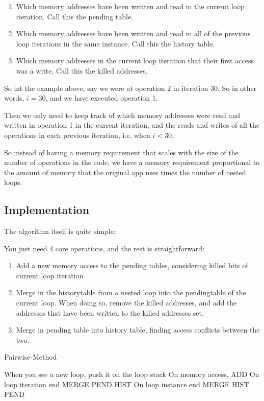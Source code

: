 \documentclass[12pt,twoside]{reedthesis}
\begin{document}
		\begin{enumerate}
			\item Which memory addresses have been written and read in the current loop iteration. Call this the pending table.
			\item Which memory addresses have been written and read in all of the previous loop iterations in the same instance. Call this the history table.
			\item Which memory addresses in the current loop iteration that their first access was a write. Call this the killed addresses.
		\end{enumerate}

		So int the example above, say we were at operation 2 in iteration 30. So in other words, $i=30$, and we have executed operation 1.

		Then we only need to keep track of which memory addresses were read and written in operation 1 in the current iteration, and the reads and writes of all the operations in each previous iteration, i.e. when $i < 30$.

		So instead of having a memory requirement that scales with the size of the number of operations in the code, we have a memory requirement proportional to the amount of memory that the original app uses times the number of nested loops.

		\subsection{Implementation}

		The algorithm itself is quite simple:

		You just need 4 core operations, and the rest is straightforward:

		\begin{enumerate}
			\item Add a new memory access to the pending tables, considering killed bits of current loop iteration
			\item Merge in the historytable from a nested loop into the pendingtable of the current loop. When doing so, remove the killed addresses, and add the addresses that have been written to the killed addresses set.
			\item Merge in pending table into history table, finding access conflicts between the two.
		\end{enumerate}

		\begin{algorithm}
			\caption{Pairwise-Method}\label{pairwise-method}
			\begin{algorithmic}[1]
				\State When you see a new loop, push it on the loop stack
				\State On memory access, \textsc{ADD}
				\State On loop iteration end \textsc{MERGE PEND HIST}
				\State On loop instance end \textsc{MERGE HIST PEND}
			\end{algorithmic}
		\end{algorithm}
\end{document}
